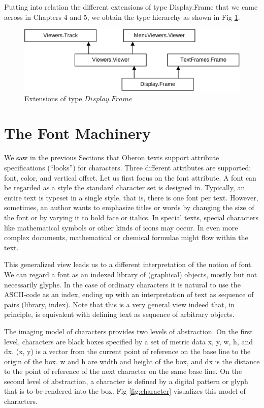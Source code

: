 Putting into relation the different extensions of type Display.Frame that we came across in Chapters
4 and 5, we obtain the type hierarchy as shown in Fig \ref{fig:extensions}.
\begin{figure}
	\label{fig:extensions}
	\centering
	\includegraphics[width=\textwidth]{i/h}
	\caption{Extensions of type $Display.Frame$}
\end{figure}

\section{The Font Machinery}
We saw in the previous Sections that Oberon texts support attribute specifications (“looks”) for
characters. Three different attributes are supported: font, color, and vertical offset. Let us first focus
on the font attribute. A font can be regarded as a style the standard character set is designed in.
Typically, an entire text is typeset in a single style, that is, there is one font per text. However,
sometimes, an author wants to emphasize titles or words by changing the size of the font or by
varying it to bold face or italics. In special texts, special characters like mathematical symbols or
other kinds of icons may occur. In even more complex documents, mathematical or chemical
formulae might flow within the text.

This generalized view leads us to a different interpretation of the notion of font. We can regard a
font as an indexed library of (graphical) objects, mostly but not necessarily glyphs. In the case of
ordinary characters it is natural to use the ASCII-code as an index, ending up with an interpretation
of text as sequence of pairs (library, index). Note that this is a very general view indeed that, in
principle, is equivalent with defining text as sequence of arbitrary objects.

The imaging model of characters provides two levels of abstraction. On the first level, characters
are black boxes specified by a set of metric data x, y, w, h, and dx. (x, y) is a vector from the current
point of reference on the base line to the origin of the box. w and h are width and height of the box,
and dx is the distance to the point of reference of the next character on the same base line. On the
second level of abstraction, a character is defined by a digital pattern or glyph that is to be rendered
into the box. Fig \ref{fig:character} visualizes this model of characters.

